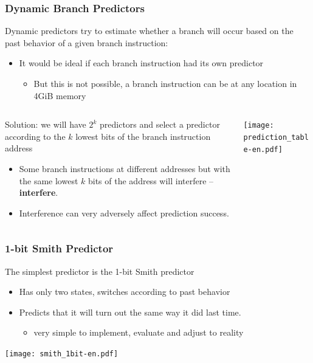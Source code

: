 \documentclass{beamer}
\begin{document}
\begin{frame}
\frametitle{Dynamic Branch Predictors}

\small
Dynamic predictors try to estimate whether a branch will occur based on the past behavior of a given branch instruction:
\begin{itemize}
\item It would be ideal if each branch instruction had its own predictor
\begin{itemize}
\small
\item But this is not possible, a branch instruction can be at any location in 4GiB memory
\end{itemize}
\end{itemize}


\begin{columns}[T]
\begin{column}{0.5\textwidth}
\small
Solution: we will have $2^k$ predictors and select a predictor according to the $k$ lowest bits of the branch instruction address
\begin{itemize}
\item Some branch instructions at different addresses but with the same lowest $k$ bits of the address will interfere -- \textbf{interfere}.
\item Interference can very adversely affect prediction success.
\end{itemize}
\end{column}
\begin{column}{0.5\textwidth}
\texttt{[image: prediction\_table-en.pdf]}
\end{column}
\end{columns}

\end{frame}


\begin{frame}
\frametitle{1-bit Smith Predictor}

The simplest predictor is the 1-bit Smith predictor
\begin{itemize}
\item Has only two states, switches according to past behavior
\item Predicts that it will turn out the same way it did last time.
\begin{itemize}
\item very simple to implement, evaluate and adjust to reality
\end{itemize}
\end{itemize}

\begin{center}
\texttt{[image: smith\_1bit-en.pdf]}
\end{center}

\end{frame}
\end{document}
